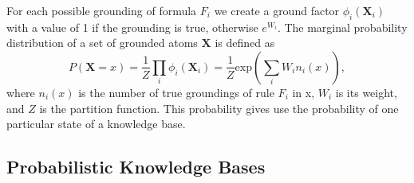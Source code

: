 For each possible grounding of formula \(F_i\) we create a ground factor
\(\phi_i(\mathbf{X}_i)\) with a value of 1 if the grounding is true, otherwise
\(e^{W_i}\). The marginal probability distribution of a set of grounded atoms \(\mathbf{X}\) is defined as
\begin{equation}
\label{eq:probqa-marginal}
P(\mathbf{X} = x) = \frac{1}{Z} \prod_i \phi_i (\mathbf{X}_i) = \frac{1}{Z} \text{exp} \left( \sum_i W_i n_i(x) \right),
\end{equation}
where \(n_i(x)\) is the number of true groundings of rule \(F_i\) in x, \(W_i\) is its weight, and \(Z\) is the partition function.
This probability gives use the probability of one particular state of a knowledge base.







\subsection{Probabilistic Knowledge Bases}

